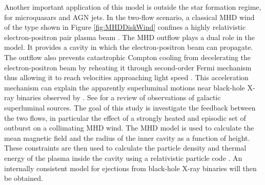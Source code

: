 Another important application of this model is
outside the star formation regime, for 
microquasars and AGN jets.
In the two-flow scenario, a classical MHD wind of the type 
shown in Figure \ref{fig:MHDDiskWind} confines a highly relativistic electron-positron
pair plasma beam \citep{1991ApJ...383L...7H}.
The MHD outflow plays a dual role in the model. It provides a cavity in which the electron-positron
beam can propagate. The outflow also prevents catastrophic Compton cooling from decelerating the
electron-positron beam by reheating it through second-order Fermi mechanism
thus allowing it to reach velocities approaching light speed 
\citep[typically 92-99\%,][]{1998MNRAS.300.1047R}. 
This acceleration mechanism can explain the apparently superluminal motions near
black-hole X-ray binaries observed by \citet{1992Natur.358..215M}. See \citet{1999ARA&A..37..409M} for a
review of observations of galactic superluminal sources.
The goal of this study is investigate the feedback between
the two flows, in particular the effect of a strongly heated and episodic set of
outburst on a collimating MHD wind. 
The MHD model is used to calculate the mean magnetic field and the radius of the
inner cavity as a function of height.
These constraints are then used to calculate the particle density and thermal
energy of the plasma inside the cavity using a relativistic particle code
\citep{2006A&A...454L...1S}.
An internally consistent model for ejections from black-hole X-ray binaries will
then be obtained.




